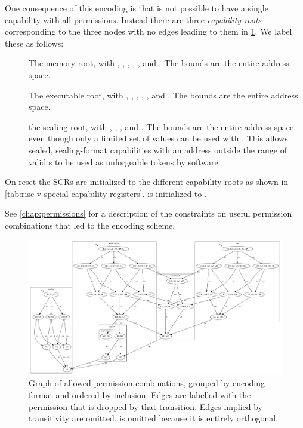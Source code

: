 One consequence of this encoding is that is not possible to have a single capability with all permissions.
Instead there are three \emph{capability roots} corresponding to the three nodes with no edges leading to them in \cref{fig:perms5clustered}.
We label these as follows:

\begin{description}
  \item[\caprootM] The memory root, with \cappermG, \cappermL, \cappermS, \cappermMC, \cappermSLC, \cappermILG and \cappermLM.
  The bounds are the entire address space.
  \item[\caprootX] The executable root, with \cappermG, \cappermX, \cappermL, \cappermLC, \cappermILG, \cappermLM and \cappermASR.
  The bounds are the entire address space.
  \item[\caprootS] the sealing root, with \cappermG, \cappermSeal, \cappermUnseal, and \cappermUZ.
  The bounds are the entire address space even though only a limited set of \cotype{} values can be used with .
  This allows sealed, sealing-format capabilities with an address outside the range of valid \cotype{}s to be used as unforgeable tokens by software.
\end{description}

On reset the SCRs are initialized to the different capability roots as shown in \cref{tab:risc-v-special-capability-registers}.
\PCC{} is initialized to \caprootX.

See \cref{chap:permissions} for a description of the constraints on useful permission combinations that led to the encoding scheme.

\thispagestyle{empty}
\begin{landscape}
    \begin{figure}
        \centering
        \includegraphics[width=\hsize]{misc/perms/perms5_clustered.pdf}
        \caption{\label{fig:perms5clustered}Graph of allowed permission combinations, grouped by encoding format and ordered by inclusion.
        Edges are labelled with the permission that is dropped by that transition.
        Edges implied by transitivity are omitted.
        \cappermG is omitted because it is entirely orthogonal.}
    \end{figure}
\end{landscape}
\restoregeometry


